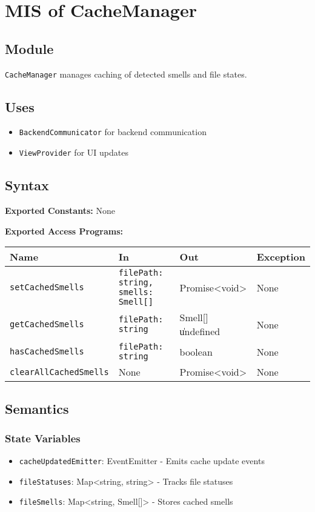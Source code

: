 \documentclass[12pt, titlepage]{article}
\begin{document}
\section{MIS of CacheManager}

\subsection{Module}
\texttt{CacheManager} manages caching of detected smells and file states.

\subsection{Uses}
\begin{itemize}
\item \texttt{BackendCommunicator} for backend communication
\item \texttt{ViewProvider} for UI updates
\end{itemize}

\subsection{Syntax}

\textbf{Exported Constants:} None

\textbf{Exported Access Programs:}\\
\begin{tabularx}{\linewidth}{|l|>{\raggedright\arraybackslash}X|l|l|}
  \hline
  \textbf{Name} & \textbf{In} & \textbf{Out} & \textbf{Exception} \\
  \hline
  \texttt{setCachedSmells} & \texttt{filePath: string, smells: Smell[]} & Promise<void> & None \\ \hline
  \texttt{getCachedSmells} & \texttt{filePath: string} & Smell[] \| undefined & None \\ \hline
  \texttt{hasCachedSmells} & \texttt{filePath: string} & boolean & None \\ \hline
  \texttt{clearAllCachedSmells} & None & Promise<void> & None \\
  \hline
\end{tabularx}

\subsection{Semantics}

\subsubsection{State Variables}
\begin{itemize}
\item \texttt{cacheUpdatedEmitter}: EventEmitter - Emits cache update events
\item \texttt{fileStatuses}: Map<string, string> - Tracks file statuses
\item \texttt{fileSmells}: Map<string, Smell[]> - Stores cached smells
\end{itemize}
\end{document}

